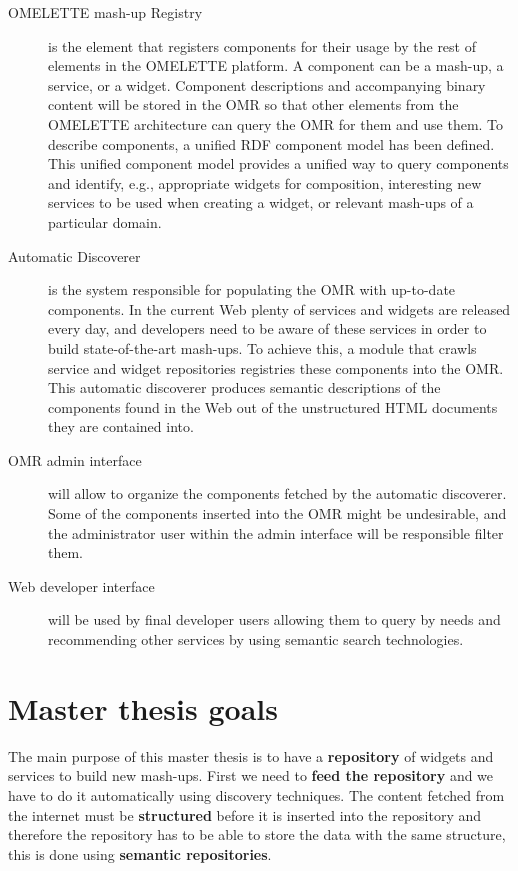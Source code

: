 \begin{description}

\item[OMELETTE mash-up Registry]  is the element that registers components for their usage by the rest of elements in the OMELETTE platform. A component can be a mash-up, a service, or a widget. Component descriptions and accompanying binary content will be stored in the OMR so that other elements from the OMELETTE architecture can query the OMR for them and use them. To describe components, a unified RDF component model has been defined. This unified component model provides a unified way to query components and identify, e.g., appropriate widgets for composition, interesting new services to be used when creating a widget, or relevant mash-ups of a particular domain.

\item[Automatic Discoverer] is the system responsible for populating the OMR with up-to-date components. In the current Web plenty of services and widgets are released every day, and developers need to be aware of these services in order to build state-of-the-art mash-ups. To achieve this, a module that crawls service and widget repositories registries these components into the OMR. This automatic discoverer produces semantic descriptions of the components found in the Web out of the unstructured HTML documents they are contained into.

\item[OMR admin interface] will allow to organize the components fetched by the automatic discoverer. Some of the components inserted into the OMR might be undesirable, and the administrator user within the admin interface will be responsible filter them.

\item[Web developer interface] will be used by final developer users allowing them to query by needs and recommending other services by using semantic search technologies.

\end{description}

\section{Master thesis goals}
\label{sec:masterthesisgoals}


The main purpose of this master thesis is to have a \textbf{repository} of widgets and services to build new mash-ups. First we need to \textbf{feed the repository} and we have to do it automatically using discovery techniques. The content fetched from the internet must be \textbf{structured} before it is inserted into the repository and therefore the repository has to be able to store the data with the same structure, this is done using \textbf{semantic repositories}.

